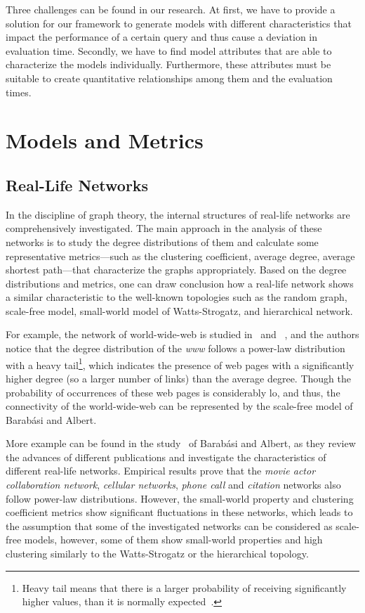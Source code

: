 Three challenges can be found in our research. At first, we have to provide a solution for our framework to generate models with different characteristics that impact the performance of a certain query and thus cause a deviation in evaluation time. Secondly, we have to find model attributes that are able to characterize the models individually. Furthermore, these attributes must be suitable to create quantitative relationships among them and the evaluation times.

\section{Models and Metrics}
\subsection{Real-Life Networks}

In the discipline of graph theory, the internal structures of real-life networks are comprehensively investigated. The main approach in the analysis of these networks is to study the degree distributions of them and calculate some representative metrics---such as the clustering coefficient, average degree, average shortest path---that characterize the graphs appropriately. Based on the degree distributions and metrics, one can draw conclusion how a real-life network shows a similar characteristic to the well-known topologies such as the random graph, scale-free model, small-world model of Watts-Strogatz, and hierarchical network.

For example, the network of world-wide-web is studied in~\cite{www1} and ~\cite{www2}, and the authors notice that the degree distribution of the \textit{www} follows a power-law distribution with a heavy tail\footnote{Heavy tail means that there is a larger probability of receiving significantly higher values, than it is normally expected~\cite{heavy_tail}.}, which indicates the presence of web pages with a significantly higher degree (so a larger number of links) than the average degree. Though the probability of occurrences of these web pages is considerably lo, and thus, the connectivity of the world-wide-web can be represented by the scale-free model of Barabási and Albert.


More example can be found in the study~\cite{statistical_mechanics} of Barabási and Albert, as they review the advances of different publications and investigate the characteristics of different real-life networks. Empirical results prove that the \textit{movie actor collaboration network}, \textit{cellular networks}, \textit{phone call} and \textit{citation} networks also follow power-law distributions.
However, the small-world property and clustering coefficient metrics show significant fluctuations in these networks, which leads to the assumption that some of the investigated networks can be considered as scale-free models, however, some of them show small-world properties and high clustering similarly to the Watts-Strogatz or the hierarchical topology.

